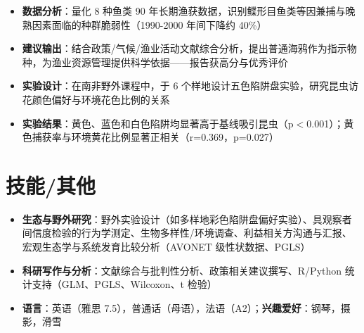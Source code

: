 \documentclass{my-resume}
\begin{document}
\begin{itemize}[parsep=0.2ex]
  \item \textbf{数据分析}：量化 8 种鱼类 90 年长期渔获数据，识别鲽形目鱼类等因兼捕与晚熟因素面临的种群脆弱性（1990-2000 年间下降约 40\%）
  \item \textbf{建议输出}：结合政策/气候/渔业活动文献综合分析，提出普通海鸦作为指示物种，为渔业资源管理提供科学依据——报告获高分与优秀评价
\end{itemize}

\begin{itemize}[parsep=0.2ex]
  \item \textbf{实验设计}：在南非野外课程中，于 6 个样地设计五色陷阱盘实验，研究昆虫访花颜色偏好与环境花色比例的关系
  \item \textbf{实验结果}：黄色、蓝色和白色陷阱均显著高于基线吸引昆虫（p$<$0.001）；黄色捕获率与环境黄花比例显著正相关（r=0.369，p=0.027）
\end{itemize}

\section{技能/其他}
\entrySkillsSep
\begin{itemize}[parsep=0.2ex]
  \item \textbf{生态与野外研究}：野外实验设计（如多样地彩色陷阱盘偏好实验）、具观察者间信度检验的行为学测定、生物多样性/环境调查、利益相关方沟通与汇报、宏观生态学与系统发育比较分析（AVONET 级性状数据、PGLS）
  \item \textbf{科研写作与分析}：文献综合与批判性分析、政策相关建议撰写、R/Python 统计支持（GLM、PGLS、Wilcoxon、t 检验）
  \item \textbf{语言}：英语（雅思 7.5），普通话（母语），法语（A2）；\textbf{兴趣爱好}：钢琴，摄影，滑雪
\end{itemize}
\end{document}
